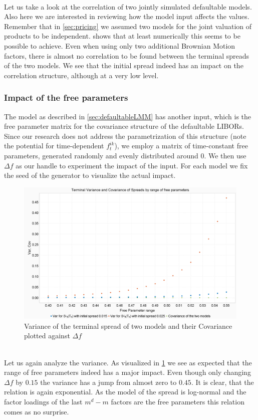 \documentclass[12pt]{article}
\begin{document}
	\\Let us take a look at the correlation of two jointly simulated defaultable models. Also here we are interested in reviewing how the model input affects the values. Remember that in \cref{sec:pricing} we assumed two models for the joint valuation of products to be independent.  shows that at least numerically this seems to be possible to achieve. Even when using only two additional Brownian Motion factors, there is almost no correlation to be found between the terminal spreads of the two models. We see that the initial spread indeed has an impact on the correlation structure, although at a very low level.
	
	\subsubsection{Impact of the free parameters}\label{sec:impactofdeltaf}
	The model as described in \cref{sec:defaultableLMM} has another input, which is the free parameter matrix for the covariance structure of the defaultable LIBORs. 
	Since our research does not address the parametrization of this structure (note the potential for time-dependent $f^{i k}_t$), we employ a matrix of time-constant free parameters, generated randomly and evenly distributed around 0. We then use $\Delta f$ as our handle to experiment the impact of the input. For each model we fix the seed of the generator to visualize the actual impact.
	\begin{figure}[h!]
		\centering
		\includegraphics[width=0.7\linewidth]{figures/Today/SpreadVarCovByFreeParameters}
		\caption{Variance of the terminal spread of two models and their Covariance plotted against $\Delta f$}
		\label{fig:spreadvarcovbyfreeparameters}
	\end{figure}
	\\Let us again analyze the variance. As visualized in \cref{fig:spreadvarcovbyfreeparameters} we see as expected that the range of free parameters indeed has a major impact. Even though only changing $\Delta f$ by $0.15$ the variance has a jump from almost zero to $0.45$. It is clear, that the relation is again exponential. As the model of the spread is log-normal and the factor loadings of the last $m^d - m$ factors are the free parameters this relation comes as no surprise.
\end{document}
